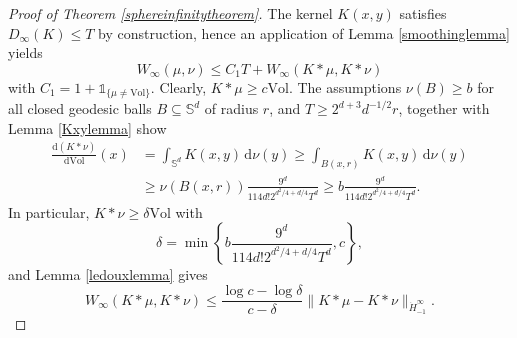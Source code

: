 \documentclass[11pt,a4paper]{article}
\theoremstyle{definition}
\begin{document}
\begin{proof}[Proof of Theorem \ref{sphereinfinitytheorem}] The kernel $K(x,y)$ satisfies $D_{\infty}(K) \le T$ by construction, hence an application of Lemma \ref{smoothinglemma} yields
\begin{equation}\label{sphereinfinity1}
W_{\infty} (\mu, \nu) \le C_1 T + W_{\infty} (K*\mu, K*\nu)
\end{equation}
with $C_1 = 1+\mathds{1}_{\{ \mu \neq \mathrm{Vol} \}}$. Clearly, $K*\mu \ge c \mathrm{Vol}$. The assumptions $\nu(B) \ge b$ for all closed geodesic balls $B \subseteq \mathbb{S}^d$ of radius $r$, and $T \ge 2^{d+3}d^{-1/2} r$, together with Lemma \ref{Kxylemma} show
\[ \begin{split} \frac{\mathrm{d}(K*\nu)}{\mathrm{d}\mathrm{Vol}}(x) &= \int_{\mathbb{S}^d} K(x,y) \, \mathrm{d}\nu(y) \ge \int_{B(x,r)} K(x,y) \, \mathrm{d}\nu(y) \\ &\ge \nu (B(x,r)) \frac{9^d}{114 d! 2^{d^2/4+d/4}T^d} \ge b \frac{9^d}{114 d! 2^{d^2/4+d/4}T^d} . \end{split} \]
In particular, $K*\nu \ge \delta \mathrm{Vol}$ with
\[ \delta = \min \left\{ b \frac{9^d}{114 d! 2^{d^2/4+d/4}T^d}, c \right\} , \]
and Lemma \ref{ledouxlemma} gives
\begin{equation}\label{sphereinfinity2}
W_{\infty} (K*\mu, K*\nu ) \le \frac{\log c - \log \delta}{c-\delta} \| K*\mu - K*\nu \|_{\dot{H}_{-1}^{\infty}} .
\end{equation}


\end{proof}
\end{document}
